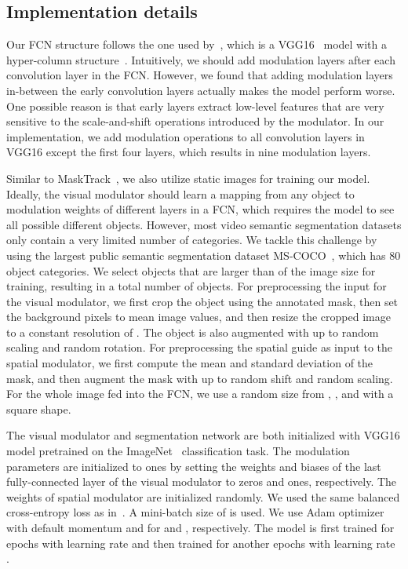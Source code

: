 \documentclass[10pt,twocolumn,letterpaper]{article}
\begin{document}
\subsection{Implementation details}
 
Our FCN structure follows the one used by~\cite{Caelles2017osvos}, which is a VGG16~\cite{simonyan2014very} model with a hyper-column structure~\cite{Hariharan2015hypercolumns}.
Intuitively, we should add modulation layers after each convolution layer in the FCN. However, we found that adding modulation layers in-between the early convolution layers actually makes the model perform worse. One possible reason is that early layers extract low-level features that are very sensitive to the scale-and-shift operations introduced by the modulator. In our implementation, we add modulation operations to all convolution layers in VGG16 except the first four layers, which results in nine modulation layers.

Similar to MaskTrack~\cite{Perazzi2017masktrack}, we also utilize static images for training our model. Ideally, the visual modulator should learn a mapping from any object to modulation weights of different layers in a FCN, which requires the model to see all possible different objects. However, most video semantic segmentation datasets only contain a very limited number of categories. We tackle this challenge by using the largest public semantic segmentation dataset MS-COCO~\cite{Lin2014mscoco}, which has 80 object categories. We select objects that are larger than  of the image size for training, resulting in a total number of  objects. For preprocessing the input for the visual modulator, we first crop the object using the annotated mask, then set the background pixels to mean image values, and then resize the cropped image to a constant resolution of . The object is also augmented with up to  random scaling and  random rotation. For preprocessing the spatial guide as input to the spatial modulator, we first compute the mean and standard deviation of the mask, and then augment the mask with up to  random shift and  random scaling. For the whole image fed into the FCN, we use a random size from , , and  with a square shape. 

The visual modulator and segmentation network are both initialized with VGG16 model pretrained on the ImageNet~\cite{Deng2009imagenet} classification task. The modulation parameters  are initialized to ones by setting the weights and biases of the last fully-connected layer of the visual modulator to zeros and ones, respectively. The weights of spatial modulator are initialized randomly. We used the same balanced cross-entropy loss as in~\cite{Caelles2017osvos}. A mini-batch size of  is used. We use Adam optimizer with default momentum  and  for  and , respectively. The model is first trained for  epochs with learning rate  and then trained for another  epochs with learning rate .
\end{document}
